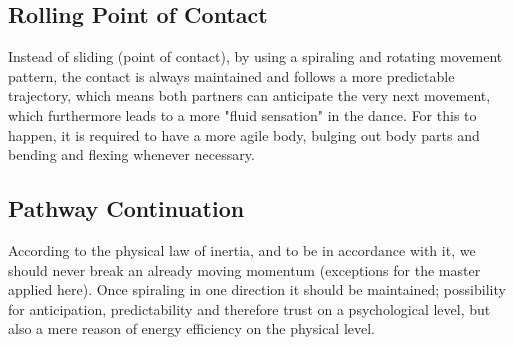 \subsection{Rolling Point of Contact}

Instead of sliding (point of contact), by using a spiraling and rotating movement pattern, the contact is always maintained and follows a more predictable trajectory, which means both partners can anticipate the very next movement, which furthermore leads to a more "fluid sensation" in the dance. For this to happen, it is required to have a more agile body, bulging out body parts and bending and flexing whenever necessary.

\subsection{Pathway Continuation}

According to the physical law of inertia, and to be in accordance with it, we should never break an already moving momentum (exceptions for the master applied here). Once spiraling in one direction it should be maintained; possibility for anticipation, predictability and therefore trust on a psychological level, but also a mere reason of energy efficiency on the physical level.